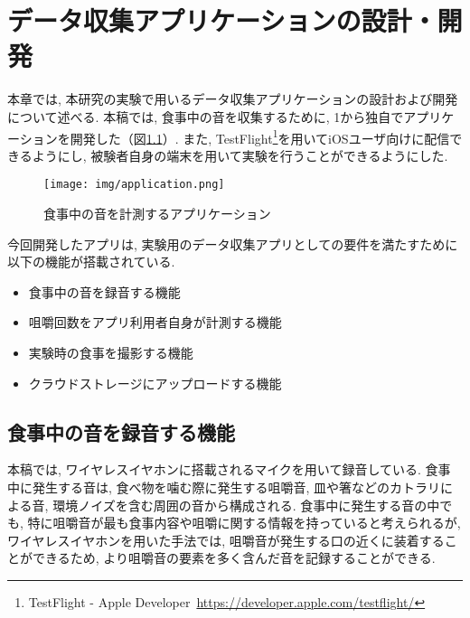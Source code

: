 
\chapter{データ収集アプリケーションの設計・開発}

本章では, 本研究の実験で用いるデータ収集アプリケーションの設計および開発について述べる. 本稿では, 食事中の音を収集するために, 1から独自でアプリケーションを開発した（図\ref{fig:application}）. また, TestFlight\footnote{TestFlight - Apple Developer~\url{https://developer.apple.com/testflight/}}を用いてiOSユーザ向けに配信できるようにし, 被験者自身の端末を用いて実験を行うことができるようにした.

\begin{figure}[t]
    \begin{center}
        \texttt{[image: img/application.png]}
        \caption{食事中の音を計測するアプリケーション}
        \label{fig:application}
    \end{center}
\end{figure}

今回開発したアプリは, 実験用のデータ収集アプリとしての要件を満たすために以下の機能が搭載されている.

\begin{itemize}
    \item 食事中の音を録音する機能
    \item 咀嚼回数をアプリ利用者自身が計測する機能
    \item 実験時の食事を撮影する機能
    \item クラウドストレージにアップロードする機能
\end{itemize}

\section{食事中の音を録音する機能}

本稿では, ワイヤレスイヤホンに搭載されるマイクを用いて録音している. 食事中に発生する音は, 食べ物を噛む際に発生する咀嚼音, 皿や箸などのカトラリによる音, 環境ノイズを含む周囲の音から構成される. 食事中に発生する音の中でも, 特に咀嚼音が最も食事内容や咀嚼に関する情報を持っていると考えられるが, ワイヤレスイヤホンを用いた手法では, 咀嚼音が発生する口の近くに装着することができるため, より咀嚼音の要素を多く含んだ音を記録することができる.


